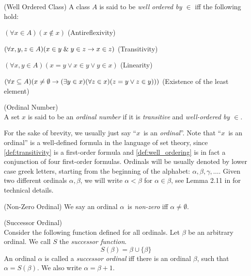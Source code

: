 \begin{definition}{(Well Ordered Class)}\label{def:well_ordering} %
A class $A$ is said to be \emph{well ordered by $\in$} iff the following hold:
\bce[(i)]
\item $(\forall x \in A)(x \not\in x)$ (Antireflexivity)
\item $(\forall x, y, z \in A)(x \in y \mathrel{\&} y \in z \rightarrow x \in z)$ (Transitivity)
\item $(\forall x, y \in A)(x = y \lor x \in y \lor y \in x)$ (Linearity)
\item $(\forall x \subseteq A)(x \neq \emptyset \rightarrow (\exists y \in x)(\forall z \in x)(z = y \lor z \in y)))$ (Existence of the least element)
\ece
\end{definition}

\begin{definition}{(Ordinal Number)}\label{def:ordinal}\\ %
A set $x$ is said to be an \emph{ordinal number} if it is \emph{transitive} and \emph{well-ordered by $\in$}. 
\end{definition}
For the sake of brevity, we usually just say ``$x$~is an \emph{ordinal}''. 
Note that ``$x$~is an ordinal'' is a well-defined formula in the language of set theory, since \ref{def:transitivity} is a first-order formula and \ref{def:well_ordering} is in fact a conjunction of four first-order formulas.
Ordinals will be usually denoted by lower case greek letters, starting from the beginning of the alphabet: $\alpha, \beta, \gamma, \ldots$.
Given two different ordinals $\alpha, \beta$, we will write $\alpha < \beta$ for $\alpha \in \beta$, see Lemma 2.11 in \cite{JechBook} for technical details.

\begin{definition}{(Non-Zero Ordinal)} %
We say an ordinal $\alpha$ is \emph{non-zero} iff $\alpha \neq \emptyset$.
\end{definition}

\begin{definition}{(Successor Ordinal)}\label{def:successor_ordinal}\\ %
Consider the following function defined for all ordinals. Let $\beta$ be an arbitrary ordinal. We call $S$ the \emph{successor function}.
\begin{equation}
S(\beta) = \beta \cup \{\beta\}
\end{equation}
An ordinal $\alpha$ is called a \emph{successor ordinal} iff there is an ordinal $\beta$, such that $\alpha = S(\beta)$. We also write $\alpha = \beta+1$.
\end{definition}

